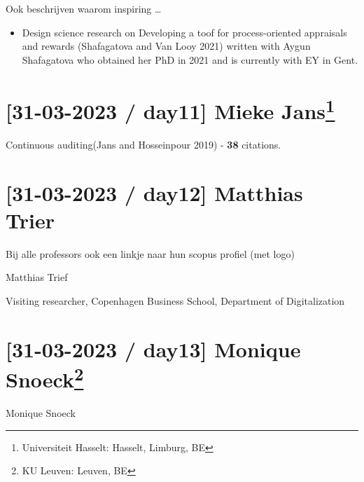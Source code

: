 \documentclass[
  letterpaper,
  DIV=11,
  numbers=noendperiod]{scrreprt}
\providecommand{\tightlist}{%
  \setlength{\itemsep}{0pt}\setlength{\parskip}{0pt}}\usepackage{longtable,booktabs,array}
\begin{document}
Ook beschrijven waarom inspiring \ldots{}

\begin{itemize}
\tightlist
\item
  Design science research on Developing a toof for process-oriented
  appraisals and rewards (Shafagatova and Van Looy 2021) written with
  Aygun
  Shafagatova
  who obtained her PhD in 2021 and is currently with EY in Gent.
\end{itemize}

\hypertarget{day11-mieke-jans2}{%
\section[{[}31-03-2023 / day11{]} Mieke
Jans]{\texorpdfstring{{[}31-03-2023 / day11{]} Mieke
Jans\footnote{Universiteit Hasselt: Hasselt, Limburg, BE}}{{[}31-03-2023 / day11{]} Mieke Jans}}\label{day11-mieke-jans2}}


Continuous auditing(Jans and Hosseinpour 2019) - \textbf{38} citations.

\hypertarget{day12-matthias-trier}{%
\section{{[}31-03-2023 / day12{]} Matthias
Trier}\label{day12-matthias-trier}}

Bij alle professors ook een linkje naar hun scopus profiel (met logo)


Matthias Trief

Visiting researcher, Copenhagen Business School, Department of
Digitalization

\hypertarget{day13-monique-snoeck3}{%
\section[{[}31-03-2023 / day13{]} Monique
Snoeck]{\texorpdfstring{{[}31-03-2023 / day13{]} Monique
Snoeck\footnote{KU Leuven: Leuven, BE}}{{[}31-03-2023 / day13{]} Monique Snoeck}}\label{day13-monique-snoeck3}}


Monique Snoeck
\end{document}

